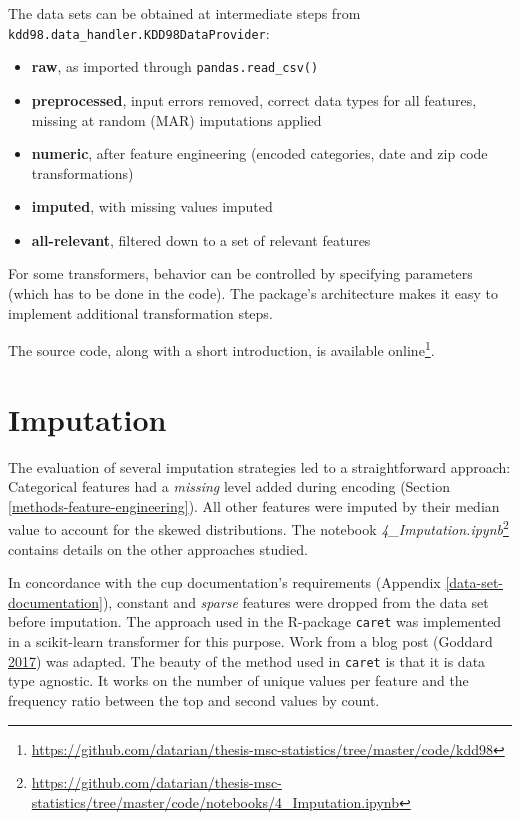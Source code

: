 \documentclass[
  11pt,
  a4paper,
  DIV=12,captions=tableheading,oneside,titlepage]{scrbook}
\providecommand{\tightlist}{%
  \setlength{\itemsep}{0pt}\setlength{\parskip}{0pt}}
\begin{document}
The data sets can be obtained at intermediate steps from \texttt{kdd98.data\_handler.KDD98DataProvider}:

\begin{itemize}
\tightlist
\item
  \textbf{raw}, as imported through \texttt{pandas.read\_csv()}
\item
  \textbf{preprocessed}, input errors removed, correct data types for all features, missing at random (MAR) imputations applied
\item
  \textbf{numeric}, after feature engineering (encoded categories, date and zip code transformations)
\item
  \textbf{imputed}, with missing values imputed
\item
  \textbf{all-relevant}, filtered down to a set of relevant features
\end{itemize}

For some transformers, behavior can be controlled by specifying parameters (which has to be done in the code). The package's architecture makes it easy to implement additional transformation steps.

The source code, along with a short introduction, is available online\footnote{\url{https://github.com/datarian/thesis-msc-statistics/tree/master/code/kdd98}}.

\hypertarget{imputation-1}{%
\section{Imputation}\label{imputation-1}}

The evaluation of several imputation strategies led to a straightforward approach: Categorical features had a \emph{missing} level added during encoding (Section \ref{methods-feature-engineering}). All other features were imputed by their median value to account for the skewed distributions. The notebook \emph{4\_Imputation.ipynb}\footnote{\url{https://github.com/datarian/thesis-msc-statistics/tree/master/code/notebooks/4_Imputation.ipynb}} contains details on the other approaches studied.

In concordance with the cup documentation's requirements (Appendix \ref{data-set-documentation}), constant and \emph{sparse} features were dropped from the data set before imputation. The approach used in the R-package \texttt{caret} was implemented in a scikit-learn transformer for this purpose. Work from a blog post (Goddard \protect\hyperlink{ref-goddard2017variance}{2017}) was adapted. The beauty of the method used in \texttt{caret} is that it is data type agnostic. It works on the number of unique values per feature and the frequency ratio between the top and second values by count.
\end{document}
